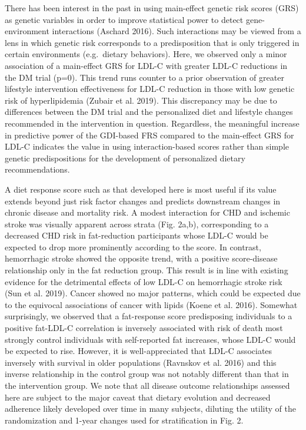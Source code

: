 \documentclass[]{article}
\begin{document}
There has been interest in the past in using main-effect genetic risk
scores (GRS) as genetic variables in order to improve statistical power
to detect gene-environment interactions (Aschard 2016). Such
interactions may be viewed from a lens in which genetic risk corresponds
to a predisposition that is only triggered in certain environments
(e.g.~dietary behaviors). Here, we observed only a minor association of
a main-effect GRS for LDL-C with greater LDL-C reductions in the DM
trial (p=0). This trend runs counter to a prior observation of greater
lifestyle intervention effectiveness for LDL-C reduction in those with
low genetic risk of hyperlipidemia (Zubair et al. 2019). This
discrepancy may be due to differences between the DM trial and the
personalized diet and lifestyle changes recommended in the intervention
in question. Regardless, the meaningful increase in predictive power of
the GDI-based FRS compared to the main-effect GRS for LDL-C indicates
the value in using interaction-based scores rather than simple genetic
predispositions for the development of personalized dietary
recommendations.

A diet response score such as that developed here is most useful if its
value extends beyond just risk factor changes and predicts downstream
changes in chronic disease and mortality risk. A modest interaction for
CHD and ischemic stroke was visually apparent across strata (Fig. 2a,b),
corresponding to a decreased CHD risk in fat-reduction participants
whose LDL-C would be expected to drop more prominently according to the
score. In contrast, hemorrhagic stroke showed the opposite trend, with a
positive score-disease relationship only in the fat reduction group.
This result is in line with existing evidence for the detrimental
effects of low LDL-C on hemorrhagic stroke risk (Sun et al. 2019).
Cancer showed no major patterns, which could be expected due to the
equivocal associations of cancer with lipids (Koene et al. 2016).
Somewhat surprisingly, we observed that a fat-response score
predisposing individuals to a positive fat-LDL-C correlation is
inversely associated with risk of death most strongly control
individuals with self-reported fat increases, whose LDL-C would be
expected to rise. However, it is well-appreciated that LDL-C associates
inversely with survival in older populations (Ravnskov et al. 2016) and
this inverse relationship in the control group was not notably different
than that in the intervention group. We note that all disease outcome
relationships assessed here are subject to the major caveat that dietary
evolution and decreased adherence likely developed over time in many
subjects, diluting the utility of the randomization and 1-year changes
used for stratification in Fig. 2.
\end{document}
